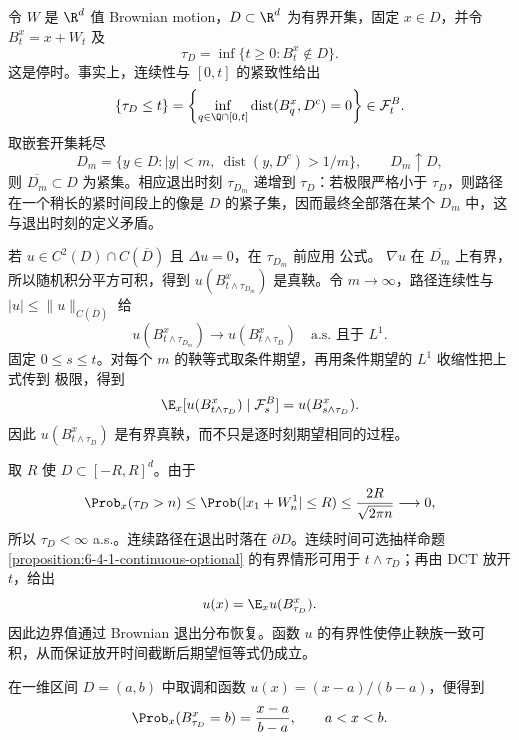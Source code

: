 \begin{example}[调和函数与退出分布]\label{ex:6-4-3-3}
令 $W$ 是 $\R^d$ 值 Brownian motion，$D\subset\R^d$ 为有界开集，固定 $x\in D$，并令
$B_t^x=x+W_t$ 及
\[
 \tau_D=\inf\{t\ge0:B_t^x\notin D\}.
\]
这是停时。事实上，连续性与 $[0,t]$ 的紧致性给出
\[
 \{\tau_D\le t\}
 =\left\{\inf_{q\in\Q\cap[0,t]}
   \operatorname{dist}(B_q^x,D^c)=0\right\}\in\mathcal F_t^B.
\]
取嵌套开集耗尽
\[
 D_m=\{y\in D:|y|<m,\ \operatorname{dist}(y,D^c)>1/m\},
 \qquad D_m\uparrow D,
\]
则 $\overline{D_m}\subset D$ 为紧集。相应退出时刻
$\tau_{D_m}$ 递增到 $\tau_D$：若极限严格小于 $\tau_D$，则路径在一个稍长的紧时间段上的像是
$D$ 的紧子集，因而最终全部落在某个 $D_m$ 中，这与退出时刻的定义矛盾。

若 $u\in C^2(D)\cap C(\overline D)$ 且 $\Delta u=0$，在 $\tau_{D_m}$ 前应用 \Ito{} 公式。
$\nabla u$ 在 $\overline{D_m}$ 上有界，所以随机积分平方可积，得到
$u(B_{t\wedge\tau_{D_m}}^x)$ 是真鞅。令 $m\to\infty$，路径连续性与
$|u|\le\|u\|_{C(\overline D)}$ 给
\[
 u(B_{t\wedge\tau_{D_m}}^x)\longrightarrow u(B_{t\wedge\tau_D}^x)
 \quad\text{a.s. 且于 }L^1.
\]
固定 $0\le s\le t$。对每个 $m$ 的鞅等式取条件期望，再用条件期望的 $L^1$ 收缩性把上式传到
极限，得到
\[
 \E_x[u(B_{t\wedge\tau_D}^x)\mid\mathcal F_s^B]
 =u(B_{s\wedge\tau_D}^x).
\]
因此 $u(B_{t\wedge\tau_D}^x)$ 是有界真鞅，而不只是逐时刻期望相同的过程。

取 $R$ 使 $D\subset[-R,R]^d$。由于
\[
 \Prob_x(\tau_D>n)
 \le\Prob(|x_1+W_n^1|\le R)
 \le\frac{2R}{\sqrt{2\pi n}}\longrightarrow0,
\]
所以 $\tau_D<\infty$ a.s.。连续路径在退出时落在 $\partial D$。连续时间可选抽样命题
\ref{proposition:6-4-1-continuous-optional} 的有界情形可用于
$t\wedge\tau_D$；再由 DCT 放开 $t$，给出
\[
 u(x)=\E_xu(B_{\tau_D}^x).
\]
因此边界值通过 Brownian 退出分布恢复。函数 $u$ 的有界性使停止鞅族一致可积，从而保证放开时间截断后期望恒等式仍成立。

在一维区间 $D=(a,b)$ 中取调和函数 $u(x)=(x-a)/(b-a)$，便得到
\[
 \Prob_x(B_{\tau_D}^x=b)=\frac{x-a}{b-a},
 \qquad a<x<b.
\]
\end{example}

